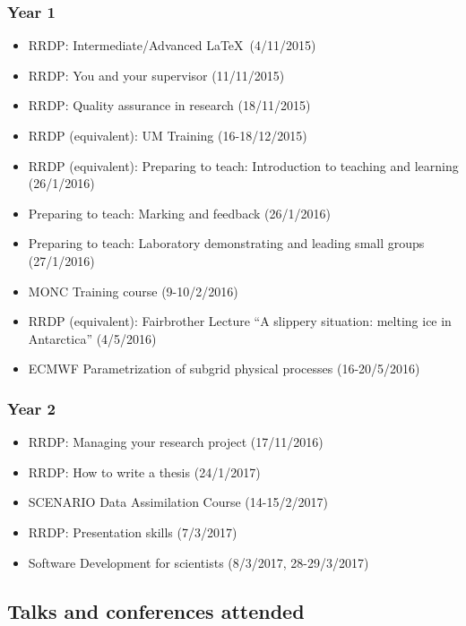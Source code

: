 \documentclass[11pt,a4paper]{article}
\begin{document}
\subsubsection*{Year 1}

\begin{itemize}
  \item RRDP: Intermediate/Advanced \LaTeX\ (4/11/2015)
  \item RRDP: You and your supervisor (11/11/2015)
  \item RRDP: Quality assurance in research (18/11/2015)
  \item RRDP (equivalent): UM Training (16-18/12/2015)
  \item RRDP (equivalent): Preparing to teach: Introduction to teaching and learning (26/1/2016)
  \item Preparing to teach: Marking and feedback (26/1/2016)
  \item Preparing to teach: Laboratory demonstrating and leading small groups (27/1/2016)
  \item MONC Training course (9-10/2/2016)
  \item RRDP (equivalent): Fairbrother Lecture ``A slippery situation: melting ice in Antarctica'' (4/5/2016)
  \item ECMWF Parametrization of subgrid physical processes (16-20/5/2016)
\end{itemize}

\subsubsection*{Year 2}

\begin{itemize}
  \item RRDP: Managing your research project (17/11/2016)
  \item RRDP: How to write a thesis (24/1/2017)
  \item SCENARIO Data Assimilation Course (14-15/2/2017)
  \item RRDP: Presentation skills (7/3/2017)
  \item Software Development for scientists (8/3/2017, 28-29/3/2017)
\end{itemize}

\subsection*{Talks and conferences attended}
\end{document}

